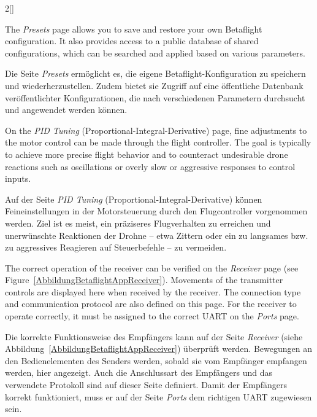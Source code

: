 \begin{paracol}{2}[]
\coleng

The \textsl{Presets} page allows you to save and restore your own Betaflight configuration. It also provides access to a public database of shared configurations, which can be searched and applied based on various parameters.

\colger

Die Seite \textsl{Presets} ermöglicht es, die eigene Betaflight-Konfiguration zu speichern und wiederherzustellen. Zudem bietet sie Zugriff auf eine öffentliche Datenbank veröffentlichter Konfigurationen, die nach verschiedenen Parametern durchsucht und angewendet werden können.

\coleng

On the \textsl{PID Tuning} (Proportional-Integral-Derivative) page, fine adjustments to the motor control can be made through the flight controller. The goal is typically to achieve more precise flight behavior and to counteract undesirable drone reactions such as oscillations or overly slow or aggressive responses to control inputs.

\colger

Auf der Seite \textsl{PID Tuning} (Proportional-Integral-Derivative) können Feineinstellungen in der Motorsteuerung durch den Flugcontroller vorgenommen werden. Ziel ist es meist, ein präziseres Flugverhalten zu erreichen und unerwünschte Reaktionen der Drohne -- etwa Zittern oder ein zu langsames bzw. zu aggressives Reagieren auf Steuerbefehle -- zu vermeiden.

\coleng

The correct operation of the receiver can be verified on the \textsl{Receiver} page (see Figure~\ref{AbbildungBetaflightAppReceiver}). Movements of the transmitter controls are displayed here when received by the receiver. The connection type and communication protocol are also defined on this page. For the receiver to operate correctly, it must be assigned to the correct UART on the \textsl{Ports} page.

\colger

Die korrekte Funktionsweise des Empfängers kann auf der Seite \textsl{Receiver} (siehe Abbildung~\ref{AbbildungBetaflightAppReceiver}) überprüft werden. Bewegungen an den Bedienelementen des Senders werden, sobald sie vom Empfänger empfangen werden, hier angezeigt. Auch die Anschlussart des Empfängers und das verwendete Protokoll sind auf dieser Seite definiert. Damit der Empfängers korrekt funktioniert, muss er auf der Seite \textsl{Ports} dem richtigen UART zugewiesen sein.


\end{paracol}
